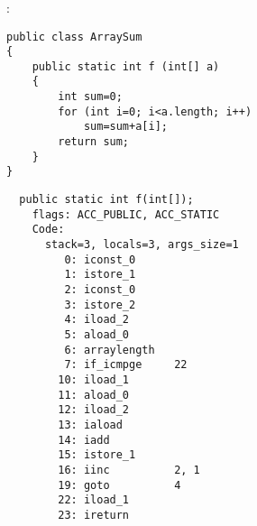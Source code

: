\subsubsection{}

:

\begin{lstlisting}
public class ArraySum
{
	public static int f (int[] a)
	{
		int sum=0;
		for (int i=0; i<a.length; i++)
			sum=sum+a[i];
		return sum;
	}
}
\end{lstlisting}

\begin{lstlisting}
  public static int f(int[]);
    flags: ACC_PUBLIC, ACC_STATIC
    Code:
      stack=3, locals=3, args_size=1
         0: iconst_0      
         1: istore_1      
         2: iconst_0      
         3: istore_2      
         4: iload_2       
         5: aload_0       
         6: arraylength   
         7: if_icmpge     22
        10: iload_1       
        11: aload_0       
        12: iload_2       
        13: iaload        
        14: iadd          
        15: istore_1      
        16: iinc          2, 1
        19: goto          4
        22: iload_1       
        23: ireturn       
\end{lstlisting}


